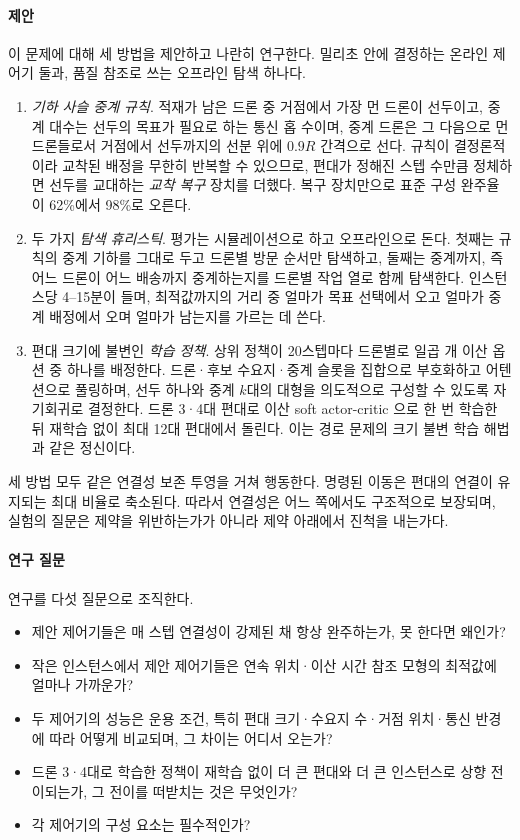 \documentclass[final,5p,times,twocolumn]{elsarticle}
\begin{document}
\paragraph{제안}
이 문제에 대해 세 방법을 제안하고 나란히 연구한다. 밀리초 안에 결정하는 온라인 제어기 둘과, 품질
참조로 쓰는 오프라인 탐색 하나다.
\begin{enumerate}
\item \emph{기하 사슬 중계 규칙}. 적재가 남은 드론 중 거점에서 가장 먼 드론이 선두이고,
중계 대수는 선두의 목표가 필요로 하는 통신 홉 수이며, 중계 드론은 그 다음으로 먼 드론들로서 거점에서
선두까지의 선분 위에 $0.9R$ 간격으로 선다. 규칙이 결정론적이라 교착된 배정을 무한히 반복할 수
있으므로, 편대가 정해진 스텝 수만큼 정체하면 선두를 교대하는 \emph{교착 복구} 장치를 더했다. 복구
장치만으로 표준 구성 완주율이 62\%에서 98\%로 오른다.
\item 두 가지 \emph{탐색 휴리스틱}. 평가는 시뮬레이션으로 하고 오프라인으로 돈다. 첫째는 규칙의
중계 기하를 그대로 두고 드론별 방문 순서만 탐색하고, 둘째는 중계까지, 즉 어느 드론이 어느 배송까지
중계하는지를 드론별 작업 열로 함께 탐색한다. 인스턴스당 4--15분이 들며, 최적값까지의 거리 중
얼마가 목표 선택에서 오고 얼마가 중계 배정에서 오며 얼마가 남는지를 가르는 데 쓴다.
\item 편대 크기에 불변인 \emph{학습 정책}. 상위 정책이 20스텝마다 드론별로 일곱 개 이산 옵션
중 하나를 배정한다. 드론·후보 수요지·중계 슬롯을 집합으로 부호화하고 어텐션으로 풀링하며,
선두 하나와 중계 $k$대의 대형을 의도적으로 구성할 수 있도록 자기회귀로 결정한다. 드론 3·4대 편대로
이산 soft actor-critic \cite{haarnoja2018}으로 한 번 학습한 뒤 재학습 없이 최대 12대 편대에서
돌린다. 이는 경로 문제의 크기 불변 학습 해법 \cite{kool2019,park2023}과 같은 정신이다.
\end{enumerate}
세 방법 모두 같은 연결성 보존 투영을 거쳐 행동한다. 명령된 이동은 편대의 연결이 유지되는 최대
비율로 축소된다. 따라서 연결성은 어느 쪽에서도 구조적으로 보장되며, 실험의 질문은 제약을
위반하는가가 아니라 제약 아래에서 진척을 내는가다.

\paragraph{연구 질문}
연구를 다섯 질문으로 조직한다.
\begin{itemize}
\item[\textbf{RQ1}] 제안 제어기들은 매 스텝 연결성이 강제된 채 항상 완주하는가, 못 한다면 왜인가?
\item[\textbf{RQ2}] 작은 인스턴스에서 제안 제어기들은 연속 위치·이산 시간 참조 모형의 최적값에
얼마나 가까운가?
\item[\textbf{RQ3}] 두 제어기의 성능은 운용 조건, 특히 편대 크기·수요지 수·거점 위치·통신 반경에
따라 어떻게 비교되며, 그 차이는 어디서 오는가?
\item[\textbf{RQ4}] 드론 3·4대로 학습한 정책이 재학습 없이 더 큰 편대와 더 큰 인스턴스로 상향
전이되는가, 그 전이를 떠받치는 것은 무엇인가?
\item[\textbf{RQ5}] 각 제어기의 구성 요소는 필수적인가?
\end{itemize}
\end{document}
